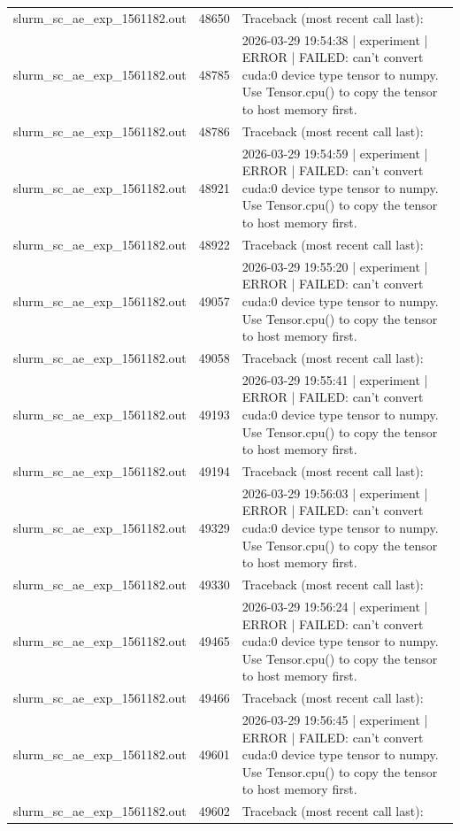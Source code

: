 \begin{tabular}{lrl}
slurm\_sc\_ae\_exp\_1561182.out & 48650 & Traceback (most recent call last): \\
slurm\_sc\_ae\_exp\_1561182.out & 48785 & 2026-03-29 19:54:38 | experiment | ERROR |   FAILED: can't convert cuda:0 device type tensor to numpy. Use Tensor.cpu() to copy the tensor to host memory first. \\
slurm\_sc\_ae\_exp\_1561182.out & 48786 & Traceback (most recent call last): \\
slurm\_sc\_ae\_exp\_1561182.out & 48921 & 2026-03-29 19:54:59 | experiment | ERROR |   FAILED: can't convert cuda:0 device type tensor to numpy. Use Tensor.cpu() to copy the tensor to host memory first. \\
slurm\_sc\_ae\_exp\_1561182.out & 48922 & Traceback (most recent call last): \\
slurm\_sc\_ae\_exp\_1561182.out & 49057 & 2026-03-29 19:55:20 | experiment | ERROR |   FAILED: can't convert cuda:0 device type tensor to numpy. Use Tensor.cpu() to copy the tensor to host memory first. \\
slurm\_sc\_ae\_exp\_1561182.out & 49058 & Traceback (most recent call last): \\
slurm\_sc\_ae\_exp\_1561182.out & 49193 & 2026-03-29 19:55:41 | experiment | ERROR |   FAILED: can't convert cuda:0 device type tensor to numpy. Use Tensor.cpu() to copy the tensor to host memory first. \\
slurm\_sc\_ae\_exp\_1561182.out & 49194 & Traceback (most recent call last): \\
slurm\_sc\_ae\_exp\_1561182.out & 49329 & 2026-03-29 19:56:03 | experiment | ERROR |   FAILED: can't convert cuda:0 device type tensor to numpy. Use Tensor.cpu() to copy the tensor to host memory first. \\
slurm\_sc\_ae\_exp\_1561182.out & 49330 & Traceback (most recent call last): \\
slurm\_sc\_ae\_exp\_1561182.out & 49465 & 2026-03-29 19:56:24 | experiment | ERROR |   FAILED: can't convert cuda:0 device type tensor to numpy. Use Tensor.cpu() to copy the tensor to host memory first. \\
slurm\_sc\_ae\_exp\_1561182.out & 49466 & Traceback (most recent call last): \\
slurm\_sc\_ae\_exp\_1561182.out & 49601 & 2026-03-29 19:56:45 | experiment | ERROR |   FAILED: can't convert cuda:0 device type tensor to numpy. Use Tensor.cpu() to copy the tensor to host memory first. \\
slurm\_sc\_ae\_exp\_1561182.out & 49602 & Traceback (most recent call last): \\

\end{tabular}
